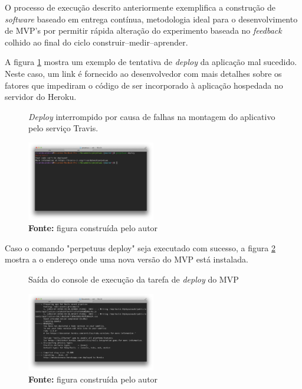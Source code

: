 O processo de execu\c{c}\~ao descrito anteriormente exemplifica a constru\c{c}\~ao de \emph{software} baseado em entrega cont\'inua, metodologia ideal para o desenvolvimento de MVP's por permitir r\'apida altera\c{c}\~ao do experimento baseada no \emph{feedback} colhido ao final do ciclo construir--medir--aprender.

\pagebreak

A figura \ref{fig:fig12} mostra um exemplo de tentativa de \emph{deploy} da aplica\c{c}\~ao mal sucedido. Neste caso, um link \'e fornecido ao desenvolvedor com mais detalhes sobre os fatores que impediram o c\'odigo de ser incorporado \`a aplica\c{c}\~ao hospedada no servidor do Heroku.

\begin{figure}[h]
  \centering
  \caption{\emph{Deploy} interrompido por causa de falhas na montagem do aplicativo pelo servi\c{c}o Travis.}
  \includegraphics[width=0.5\textwidth]{./fig/deploy1}
  \caption*{\textbf{Fonte:} figura constru\'ida pelo autor}
  \label{fig:fig12}
\end{figure}

Caso o comando "perpetuus deploy" seja executado com sucesso, a figura \ref{fig:fig13} mostra a o endere\c{c}o onde uma nova vers\~ao do MVP est\'a instalada.

\begin{figure}[h]
  \centering
  \caption{Sa\'ida do console de execu\c{c}\~ao da tarefa de \emph{deploy} do MVP}
  \includegraphics[width=0.5\textwidth]{./fig/setup5}
  \caption*{\textbf{Fonte:} figura constru\'ida pelo autor}
  \label{fig:fig13}
\end{figure}


